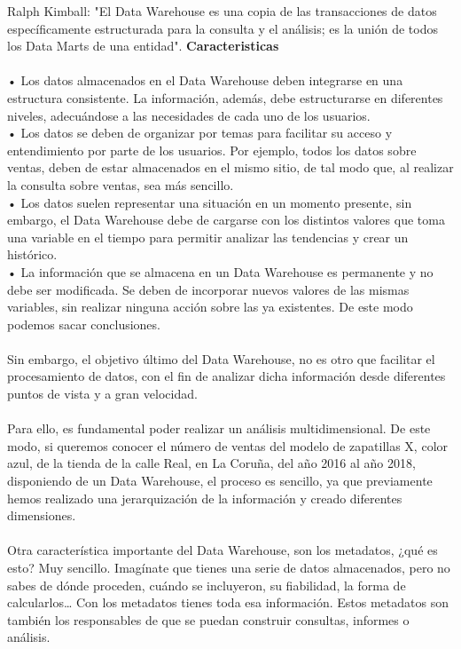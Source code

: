 {Ralph Kimball: "El Data Warehouse es una copia de las transacciones de datos específicamente estructurada para la consulta y el análisis; es la unión de todos los Data Marts de una entidad".
\textbf{Caracteristicas}\\\\
•	Los datos almacenados en el Data Warehouse deben integrarse en una estructura consistente. La información, además, debe estructurarse en diferentes niveles, adecuándose a las necesidades de cada uno de los usuarios.\\
•	Los datos se deben de organizar por temas para facilitar su acceso y entendimiento por parte de los usuarios. Por ejemplo, todos los datos sobre ventas, deben de estar almacenados en el mismo sitio, de tal modo que, al realizar la consulta sobre ventas, sea más sencillo.\\
•	Los datos suelen representar una situación en un momento presente, sin embargo, el Data Warehouse debe de cargarse con los distintos valores que toma una variable en el tiempo para permitir analizar las tendencias y crear un histórico.\\
•	La información que se almacena en un Data Warehouse es permanente y no debe ser modificada. Se deben de incorporar nuevos valores de las mismas variables, sin realizar ninguna acción sobre las ya existentes. De este modo podemos sacar conclusiones.\\\\
Sin embargo, el objetivo último del Data Warehouse, no es otro que facilitar el procesamiento de datos, con el fin de analizar dicha información desde diferentes puntos de vista y a gran velocidad.\\\\
Para ello, es fundamental poder realizar un análisis multidimensional. De este modo, si queremos conocer el número de ventas del modelo de zapatillas X, color azul, de la tienda de la calle Real, en La Coruña, del año 2016 al año 2018, disponiendo de un Data Warehouse, el proceso es sencillo, ya que previamente hemos realizado una jerarquización de la información y creado diferentes dimensiones.\\\\
Otra característica importante del Data Warehouse, son los metadatos, ¿qué es esto? Muy sencillo. Imagínate que tienes una serie de datos almacenados, pero no sabes de dónde proceden, cuándo se incluyeron, su fiabilidad, la forma de calcularlos… Con los metadatos tienes toda esa información. Estos metadatos son también los responsables de que se puedan construir consultas, informes o análisis.

}

